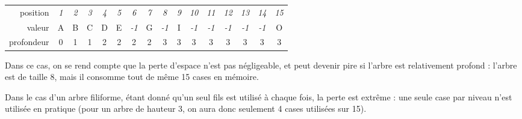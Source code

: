 \documentclass[11pt,a4paper]{article}
\begin{document}
\begin{center}
\begin{tabular}{ r c cc cccc cccccccc }
position   & \textit{1} & \textit{2} & \textit{3} & \textit{4} & \textit{5} & \textit{6} & \textit{7} &
             \textit{8} & \textit{9} & \textit{10} & \textit{11} & \textit{12} & \textit{13} &
			 \textit{14} & \textit{15} \\
\cline{2-16}
valeur     & \multicolumn{1}{|c|}{A} &
\multicolumn{1}{c|}{B} & \multicolumn{1}{c|}{C} &
\multicolumn{1}{c|}{D} & \multicolumn{1}{c|}{E} &
  \multicolumn{1}{c|}{\footnotesize \textit{-1}} & \multicolumn{1}{c|}{G} &
\multicolumn{1}{c|}{\footnotesize \textit{-1}} & \multicolumn{1}{c|}{I} & \multicolumn{1}{c|}{\footnotesize \textit{-1}} & \multicolumn{1}{c|}{\footnotesize \textit{-1}} &
  \multicolumn{1}{c|}{\footnotesize \textit{-1}} & \multicolumn{1}{c|}{\footnotesize \textit{-1}} & \multicolumn{1}{c|}{\footnotesize \textit{-1}} & \multicolumn{1}{c|}{O} \\
\cline{2-16}
profondeur & 0 &
             1 & 1 &
             2 & 2 & 2 & 2 &
             3 & 3 & 3 & 3 & 3 & 3 & 3 & 3 \\
\end{tabular}
\end{center}

\medskip

Dans ce cas, on se rend compte que la perte d'espace n'est pas négligeable, et peut devenir pire si l'arbre est relativement profond : l'arbre est de taille 8, mais il consomme tout de même 15 cases en mémoire.

\medskip

Dans le cas d'un arbre filiforme, étant donné qu'un seul fils est utilisé à chaque fois, la perte est extrême : une seule case par niveau n'est utilisée en pratique (pour un arbre de hauteur 3, on aura donc seulement 4 cases utilisées sur 15).

\medskip
\end{document}

